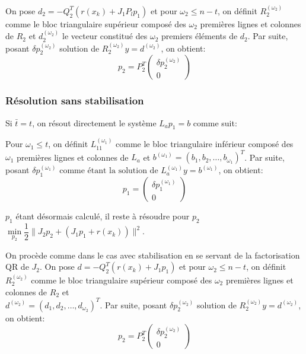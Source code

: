 \documentclass[a4paper,11pt]{article}
\numberwithin{equation}{section}
\begin{document}
On pose $d_{2} = -Q_2^T(r(x_{k}) + J_1P_lp_1)$ et pour $\omega_{2} \leq n-t$, on définit $R_{2}^{(\omega_{2} )}$ comme le bloc triangulaire supérieur composé des $\omega_{2}$ premières lignes et colonnes de $R_{2}$ et $d_{2}^{(\omega_{2})} $ le vecteur constitué des $\omega_{2}$ premiers éléments de $d_{2}$.
Par suite, posant $\delta p_2^{(\omega_{2})}$ solution de $R_{2}^{(\omega_{2})}y =d^{(\omega_{2})}$, on obtient:
\begin{equation}
p_2 = P_2^T\begin{pmatrix} \delta p_2^{(\omega_{2})} \\ 0 \end{pmatrix}
\end{equation}

\subsubsection{Résolution sans stabilisation} \label{resolutionsstab}

Si $\bar{t}=t$, on résout directement le système $L_{a}p_{1}=b$ comme suit:

Pour $\omega_{1} \leq t$, on définit $L_{11}^{(\omega_{1})}$ comme le bloc triangulaire inférieur composé des $\omega_{1}$ premières lignes et colonnes de $L_{a}$ et $b^{(\omega_{1})}= (b_1, b_2, \ldots, b_{\omega_{1}})^T$. Par suite, posant $\delta p_1^{(\omega_{1})} \text{ comme étant la solution de } L_{a}^{(\omega_{1})}y = b^{(\omega_{1})}$, on obtient:
\begin{equation} \label{calculp1}
p_1 = \begin{pmatrix} \delta p_1^{(\omega_{1})} \\ 0 \end{pmatrix}
\end{equation}

$p_1$ étant désormais calculé, il reste à résoudre pour $p_2$ $\underset{p_2}{\min} \dfrac{1}{2}\|J_2p_2 + (J_1p_1 + r(x_{k}))\|^2$. 

On procède comme dans le cas avec stabilisation en se servant de la factorisation QR de $J_2$.
On pose $d = -Q_2^T(r(x_{k}) + J_1p_1)$ et pour $\omega_{2} \leq n-t$, on définit $R_{2}^{(\omega_{2} )}$ comme le bloc triangulaire supérieur composé des $\omega_{2}$ premières lignes et colonnes de $R_{2}$ et \\ $d^{(\omega_{2})} = (d_1, d_2, \ldots, d_{\omega_{2}})^T$.
Par suite, posant $\delta p_2^{(\omega_{2})}$ solution de $R_{2}^{(\omega_{2})}y =d^{(\omega_{2})}$, on obtient:
\begin{equation} \label{calculp2}
p_2 = P_2^T\begin{pmatrix} \delta p_2^{(\omega_{2})} \\ 0 \end{pmatrix}
\end{equation}
\end{document}
